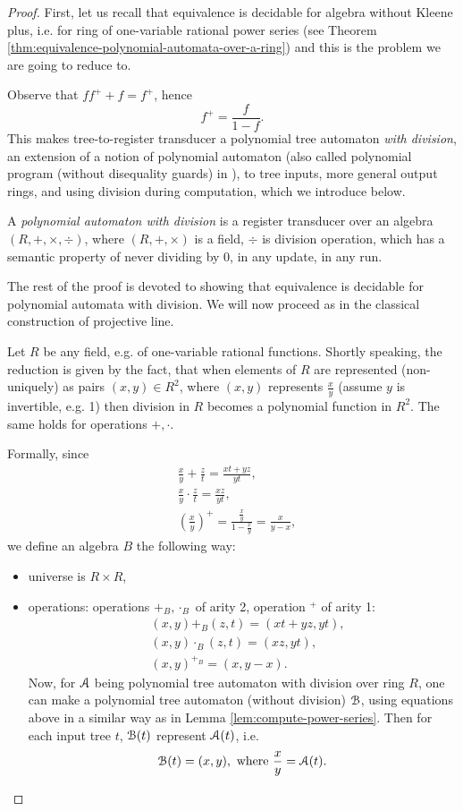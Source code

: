 \begin{proof}
    First, let us recall that equivalence is decidable for algebra \aalg without Kleene plus, i.e. for ring of one-variable rational power series  (see Theorem \ref{thm:equivalence-polynomial-automata-over-a-ring}) and this is the problem we are going to reduce to.
    
  	Observe that $ff^+ + f = f^+$, hence
  	$$
  		f^+ = \frac{f}{1-f}.
  	$$
  	This makes tree-to-\aalg register transducer a polynomial tree automaton \emph{with division}, an extension of a notion of polynomial automaton \cite{worrellBenediktDuffSharad2017}(also called polynomial program (without disequality guards) in \cite{seidlMuller-polynomial-programs04}), to tree inputs, more general output rings, and using division during computation, which we introduce below.
  	\begin{definition}
  		A \emph{polynomial automaton with division} is a register transducer over an algebra $(R, +, \times, \div)$, where $(R, +, \times)$ is a field, $\div$ is division operation, which has a semantic property of never dividing by 0, in any update, in any run.
  	\end{definition}
  		The rest of the proof is devoted to showing that equivalence is decidable for polynomial automata with division. We will now proceed as in the classical construction of projective line.
  		
  		Let $R$ be any field, e.g. of one-variable rational functions. Shortly speaking, the reduction is given by the fact, that when elements of $R$ are represented (non-uniquely) as pairs $(x,y)\in R^2$, where $(x,y)$ represents $\frac{x}{y}$ (assume $y$ is invertible, e.g. 1) then division in $R$ becomes a polynomial function in $R^2$. The same holds for operations $+, \cdot$.
  
  		Formally, since
  		\begin{align*}
  			&\frac{x}{y} + \frac{z}{t} = \frac{xt+yz}{yt},\\ 
  			&\frac{x}{y} \cdot \frac{z}{t} = \frac{xz}{yt},\\
  			&\left(\frac{x}{y}\right)^+ = \frac{\frac{x}{y}}{1-\frac{x}{y}} = \frac{x}{y-x},
  		\end{align*}
  		we define an algebra $B$ the following way:
  		\begin{itemize}
  			\item universe is $R \times R$,
  			\item operations: operations $+_B, \cdot_B$ of arity 2, operation $^+$ of arity 1:
  			\begin{align*}
  				&(x,y) +_B (z,t) = (xt+yz, yt),\\
  				&(x,y)\cdot_B(z,t) = (xz, yt),\\
  				&(x,y)^{+_B} = (x, y-x).
  			\end{align*}
  		Now, for ${\mathcal A}$ being polynomial tree automaton with division over ring $R$, one can make a polynomial tree automaton (without division) ${\mathcal B}$, using equations above in a similar way as in Lemma \ref{lem:compute-power-series}. Then for each input tree $t$, ${\mathcal B}(t)$ represent ${\mathcal A}(t)$, i.e.
  		$$
  			{\mathcal B}(t) = (x,y), \text{ where } \frac{x}{y} = {\mathcal A}(t).
  		$$
  		

\end{itemize}
\end{proof}

